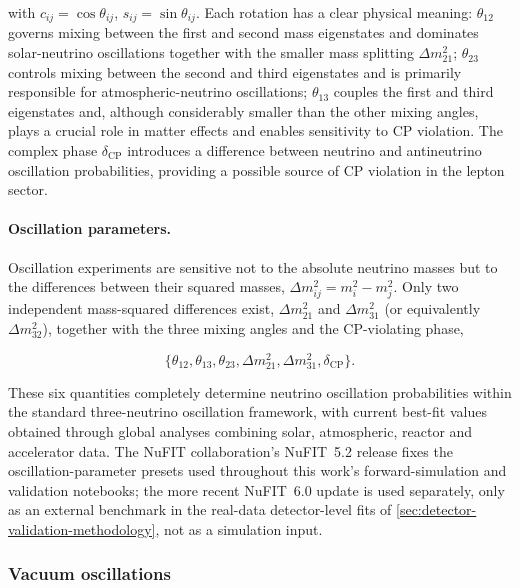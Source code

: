 with \(c_{ij}=\cos\theta_{ij}\), \(s_{ij}=\sin\theta_{ij}\). Each rotation has a clear physical meaning: \(\theta_{12}\) governs mixing between the first and second mass eigenstates and dominates solar-neutrino oscillations together with the smaller mass splitting \(\Delta m_{21}^2\); \(\theta_{23}\) controls mixing between the second and third eigenstates and is primarily responsible for atmospheric-neutrino oscillations; \(\theta_{13}\) couples the first and third eigenstates and, although considerably smaller than the other mixing angles, plays a crucial role in matter effects and enables sensitivity to CP violation. The complex phase \(\delta_{\mathrm{CP}}\) introduces a difference between neutrino and antineutrino oscillation probabilities, providing a possible source of CP violation in the lepton sector.

\paragraph{Oscillation parameters.}
Oscillation experiments are sensitive not to the absolute neutrino masses but to the differences between their squared masses, \(\Delta m_{ij}^2 = m_i^2 - m_j^2\). Only two independent mass-squared differences exist, \(\Delta m_{21}^2\) and \(\Delta m_{31}^2\) (or equivalently \(\Delta m_{32}^2\)), together with the three mixing angles and the CP-violating phase,

\begin{equation}
  \{\theta_{12},\theta_{13},\theta_{23},\Delta m_{21}^2,\Delta m_{31}^2,\delta_{\mathrm{CP}}\}.
\end{equation}

These six quantities completely determine neutrino oscillation probabilities within the standard three-neutrino oscillation framework, with current best-fit values obtained through global analyses combining solar, atmospheric, reactor and accelerator data. The NuFIT collaboration's NuFIT~5.2 release \parencite{NuFit52} fixes the oscillation-parameter presets used throughout this work's forward-simulation and validation notebooks; the more recent NuFIT~6.0 update \parencite{EstebanNuFit2024} is used separately, only as an external benchmark in the real-data detector-level fits of \cref{sec:detector-validation-methodology}, not as a simulation input.

\subsubsection{Vacuum oscillations}

